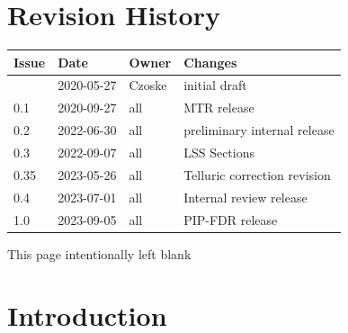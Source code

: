 \documentclass[11pt,oneside,a4paper]{article}
\begin{document}




\clearpage
\pagestyle{fancy}

\section*{Revision History}

\renewcommand{\arraystretch}{1.2}
\begin{tabularx}{\textwidth}{|l|l|l|X|}
  \hline
  \rowcolor{rd1}
  \textbf{Issue} & \textbf{Date} & \textbf{Owner} & \textbf{Changes} \\
  \hline
                 & 2020-05-27    & Czoske         & initial draft    \\
  0.1            & 2020-09-27    & all            & MTR release      \\
  0.2            & 2022-06-30    & all            & preliminary internal release      \\
  0.3            & 2022-09-07    & all  & LSS Sections \\
  0.35           & 2023-05-26    & all   & Telluric correction revision \\
  0.4            & 2023-07-01    & all   & Internal review release \\
  1.0            & 2023-09-05    & all   & PIP-FDR release \\
  \hline
\end{tabularx}


\newpage
\tableofcontents
\clearpage
\listoffigures
\clearpage
\listoftables

\clearpage
\phantom{a}
\vfill
\begin{center}
  This page intentionally left blank
\end{center}
\vfill
\clearpage



\section{Introduction}
\label{sec:intro}
\end{document}
